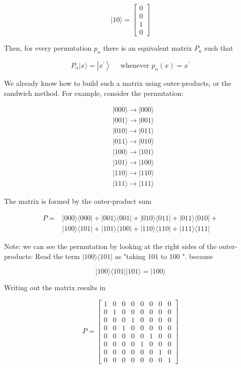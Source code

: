 \documentclass[main.tex]{subfiles}
\begin{document}
    $$
    |10\rangle=\left[\begin{array}{l}
    0 \\
    0 \\
    1 \\
    0
    \end{array}\right]
    $$
    
    Then, for every permutation $p_{n}$ there is an equivalent matrix $P_{n}$ such that
    
    $$
    P_{n}|x\rangle=\left|x^{\prime}\right\rangle \quad \text { whenever } p_{n}(x)=x^{\prime}
    $$
    
    We already know how to build such a matrix using outer-products, or the sandwich method. For example, consider the permutation:
    
    $$
    \begin{aligned}
    &|000\rangle \rightarrow|000\rangle \\
    &|001\rangle \rightarrow|001\rangle \\
    &|010\rangle \rightarrow|011\rangle \\
    &|011\rangle \rightarrow|010\rangle \\
    &|100\rangle \rightarrow|101\rangle \\
    &|101\rangle \rightarrow|100\rangle \\
    &|110\rangle \rightarrow|110\rangle \\
    &|111\rangle \rightarrow|111\rangle
    \end{aligned}
    $$
    
    The matrix is formed by the outer-product sum
    
    $$
    \begin{aligned}
    P=&|000\rangle\langle 000|+| 001\rangle\langle 001|+| 010\rangle\langle 011|+| 011\rangle\langle 010|+\\
    &|100\rangle\langle 101|+| 101\rangle\langle 100|+| 110\rangle\langle 110|+| 111\rangle\langle 111|
    \end{aligned}
    $$
    
    Note: we can see the permutation by looking at the right sides of the outer-products: Read the term $|100\rangle\langle 101|$ as "taking 101 to 100 ". because
    
    $$
    |100\rangle\langle 101|| 101\rangle=|100\rangle
    $$
    
    Writing out the matrix results in
    
    $$
    P=\left[\begin{array}{llllllll}
    1 & 0 & 0 & 0 & 0 & 0 & 0 & 0 \\
    0 & 1 & 0 & 0 & 0 & 0 & 0 & 0 \\
    0 & 0 & 0 & 1 & 0 & 0 & 0 & 0 \\
    0 & 0 & 1 & 0 & 0 & 0 & 0 & 0 \\
    0 & 0 & 0 & 0 & 0 & 1 & 0 & 0 \\
    0 & 0 & 0 & 0 & 1 & 0 & 0 & 0 \\
    0 & 0 & 0 & 0 & 0 & 0 & 1 & 0 \\
    0 & 0 & 0 & 0 & 0 & 0 & 0 & 1
    \end{array}\right]
    $$
    
\end{document}
